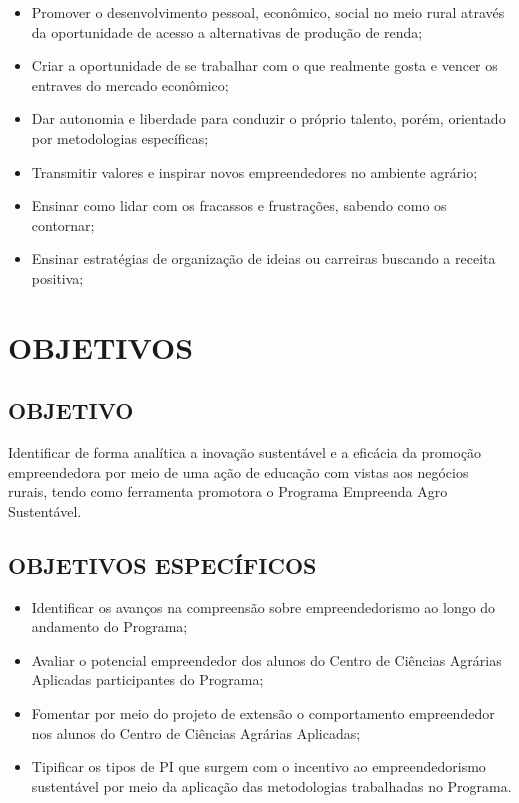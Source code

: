 \begin{itemize}
\item{Promover o desenvolvimento pessoal, econômico, social no meio rural através da oportunidade de acesso a alternativas de produção de renda;}
\item{Criar a oportunidade de se trabalhar com o que realmente gosta e vencer os entraves do mercado econômico;}
\item{Dar autonomia e liberdade para conduzir o próprio talento, porém, orientado por metodologias específicas;}
\item{Transmitir valores e inspirar novos empreendedores no ambiente agrário;}
\item{Ensinar como lidar com os fracassos e frustrações, sabendo como os contornar;}
\item{Ensinar estratégias de organização de ideias ou carreiras buscando a receita positiva;}
\end{itemize}




\section{OBJETIVOS}

\subsection{OBJETIVO}

Identificar de forma analítica a inovação sustentável e a eficácia da promoção empreendedora por meio de uma ação de educação com vistas aos negócios rurais, tendo como ferramenta promotora o Programa Empreenda Agro Sustentável.



\subsection{OBJETIVOS ESPECÍFICOS}

\begin{itemize}
\item{Identificar os avanços na compreensão sobre empreendedorismo ao longo do andamento do Programa;}
\item {Avaliar o potencial empreendedor dos alunos do Centro de Ciências Agrárias Aplicadas participantes do Programa;}
\item {Fomentar por meio do projeto de extensão o comportamento empreendedor nos alunos do Centro de Ciências Agrárias Aplicadas;}
\item {Tipificar os tipos de PI que surgem com o incentivo ao empreendedorismo sustentável por meio da aplicação das metodologias trabalhadas no Programa.}

\end{itemize}


